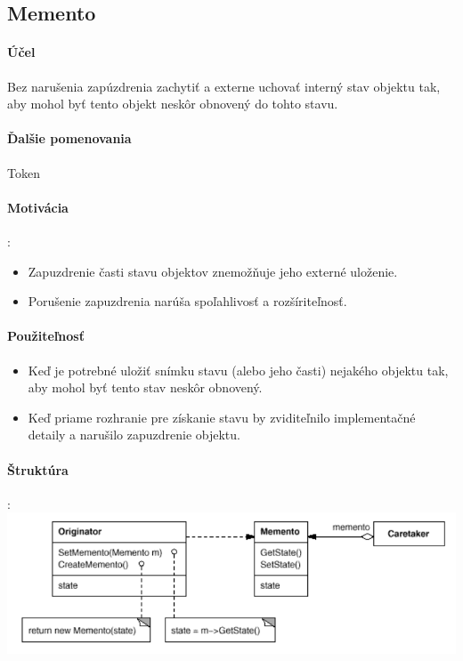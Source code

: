 	\subsection{Memento}
		\paragraph{Účel}
			Bez narušenia zapúzdrenia zachytiť a externe uchovať interný stav objektu tak, aby mohol byť tento objekt neskôr obnovený do tohto stavu.

		\paragraph{Ďalšie pomenovania}
			Token

		\paragraph{Motivácia}:\\
			\begin{itemize}
				\item Zapuzdrenie časti stavu objektov znemožňuje jeho externé uloženie.
				\item Porušenie zapuzdrenia narúša spoľahlivosť a rozšíriteľnosť.
			\end{itemize}
		\paragraph{Použiteľnosť}
			\begin{itemize}
				\item Keď je potrebné uložiť snímku stavu (alebo jeho časti) nejakého objektu tak, aby mohol byť tento stav neskôr obnovený.
				\item Keď priame rozhranie pre získanie stavu by zviditeľnilo implementačné detaily a narušilo zapuzdrenie objektu.
			\end{itemize}
		\paragraph{Štruktúra}:\\
			\includegraphics[width=.9\textwidth]{images/memento1}


